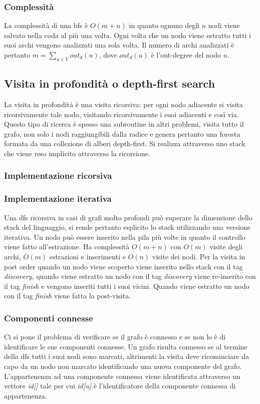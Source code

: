\subsubsection{Complessit\`a}
La complessit\`a di una bfs \`e $O(m+n)$ in quanto ognuno degli $n$ nodi viene salvato nella coda al pi\`u una volta. Ogni volta che un nodo viene estratto
tutti i suoi archi vengono analizzati una sola volta. Il numero di archi analizzati \`e pertanto $m=\sum\limits_{u\in V}out_d(u)$, dove $out_d(u)$ \`e 
l'out-degree del nodo $u$. 
\subsection{Visita in profondit\`a o depth-first search}
La visita in profondit\`a \`e una visita ricorsiva: per ogni nodo adiacente si visita ricorsivamente tale nodo, visitando ricorsivamente i suoi adiacenti
e cos\`i via. Questo tipo di ricerca \`e spesso una subroutine in altri problemi, visita tutto il grafo, non solo i nodi raggiungibili dalla radice e
genera pertanto una foresta formata da una collezione di alberi depth-first. Si realizza attraverso uno stack che viene reso implicito attraverso la 
ricorsione.
\subsubsection{Implementazione ricorsiva}

\subsubsection{Implementazione iterativa}
Una dfs ricorsiva in casi di grafi molto profondi pu\`o superare la dimensione dello stack del linguaggio, si rende pertanto esplicito lo stack utilizzando 
una versione iterativa. Un nodo pu\`o essere inserito nella pila pi\`u volte in quanto il controllo viene fatto all'estrazione. Ha complessit\`a $O(m+n)$ 
con $O(m)$ visite degli archi, $O(m)$ estrazioni e inserimenti e $O(n)$ visite dei nodi. Per la visita in post order quando un nodo viene scoperto viene
inserito nello stack con il tag \emph{discovery}, quando viene estratto un nodo con il tag \emph{discovery} viene re-inserito con il tag \emph{finish} e 
vengono inseriti tutti i suoi vicini. Quando viene estratto un nodo con il tag \emph{finish} viene fatta la post-visita.

\newpage
\subsubsection{Componenti connesse}
Ci si pone il problema di verificare se il grafo \`e connesso e se non lo \`e di identificare le sue componenti connesse. Un grafo risulta connesso se al
termine della dfs tutti i suoi nodi sono marcati, altrimenti la visita deve ricominciare da capo da un nodo non marcato identificando una nuova componente
del grafo. L'appartenenza ad una componente connessa viene identificata attraverso un vettore \emph{id[]} tale per cui \emph{id[u]} \`e l'identificatore
della componente connessa di appartenenza.
\begin{multicols}{2}

\columnbreak

\end{multicols}
